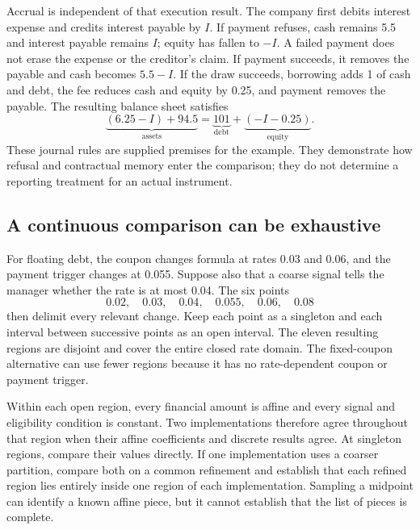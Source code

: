 Accrual is independent of that execution result. The company first debits interest expense and credits interest payable by $I$. If payment refuses, cash remains 5.5 and interest payable remains $I$; equity has fallen to $-I$. A failed payment does not erase the expense or the creditor's claim. If payment succeeds, it removes the payable and cash becomes $5.5-I$. If the draw succeeds, borrowing adds 1 of cash and debt, the fee reduces cash and equity by 0.25, and payment removes the payable. The resulting balance sheet satisfies
\begin{equation}
 \underbrace{(6.25-I)+94.5}_{\text{assets}}
 =\underbrace{101}_{\text{debt}}
  +\underbrace{(-I-0.25)}_{\text{equity}}.
\end{equation}
These journal rules are supplied premises for the example. They demonstrate how refusal and contractual memory enter the comparison; they do not determine a reporting treatment for an actual instrument.

\subsection{A continuous comparison can be exhaustive}

For floating debt, the coupon changes formula at rates 0.03 and 0.06, and the payment trigger changes at 0.055. Suppose also that a coarse signal tells the manager whether the rate is at most 0.04. The six points
\begin{equation}
 0.02,\quad0.03,\quad0.04,\quad0.055,\quad0.06,\quad0.08
\end{equation}
then delimit every relevant change. Keep each point as a singleton and each interval between successive points as an open interval. The eleven resulting regions are disjoint and cover the entire closed rate domain. The fixed-coupon alternative can use fewer regions because it has no rate-dependent coupon or payment trigger.

Within each open region, every financial amount is affine and every signal and eligibility condition is constant. Two implementations therefore agree throughout that region when their affine coefficients and discrete results agree. At singleton regions, compare their values directly. If one implementation uses a coarser partition, compare both on a common refinement and establish that each refined region lies entirely inside one region of each implementation. Sampling a midpoint can identify a known affine piece, but it cannot establish that the list of pieces is complete.


